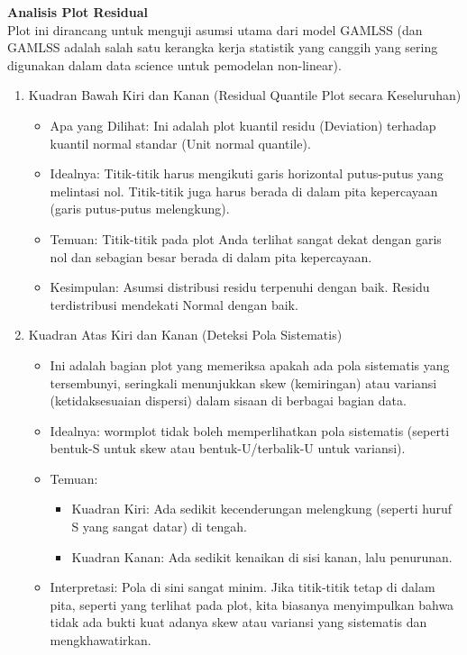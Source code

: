 \documentclass[11pt, a4paper]{article}
\begin{document}
\textbf{Analisis Plot Residual}\\
Plot ini dirancang untuk menguji asumsi utama dari model GAMLSS (dan GAMLSS adalah salah satu kerangka kerja statistik yang canggih yang sering digunakan dalam data science untuk pemodelan non-linear).
\begin{enumerate}
\item Kuadran Bawah Kiri dan Kanan (Residual Quantile Plot secara Keseluruhan)
    \begin{itemize}
    \item Apa yang Dilihat: Ini adalah plot kuantil residu (Deviation) terhadap kuantil normal standar (Unit normal quantile).
    \item Idealnya: Titik-titik harus mengikuti garis horizontal putus-putus yang melintasi nol. Titik-titik juga harus berada di dalam pita kepercayaan (garis putus-putus melengkung).
    \item Temuan: Titik-titik pada plot Anda terlihat sangat dekat dengan garis nol dan sebagian besar berada di dalam pita kepercayaan.
    \item Kesimpulan: Asumsi distribusi residu terpenuhi dengan baik. Residu terdistribusi mendekati Normal dengan baik.
    \end{itemize}
\item Kuadran Atas Kiri dan Kanan (Deteksi Pola Sistematis)
    \begin{itemize}
    \item  Ini adalah bagian plot yang memeriksa apakah ada pola sistematis yang tersembunyi, seringkali menunjukkan skew (kemiringan) atau variansi (ketidaksesuaian dispersi) dalam sisaan di berbagai bagian data.
    \item Idealnya: wormplot tidak boleh memperlihatkan pola sistematis (seperti bentuk-S untuk skew atau bentuk-U/terbalik-U untuk variansi).
    \item Temuan:
        \begin{itemize}
            \item Kuadran Kiri: Ada sedikit kecenderungan melengkung (seperti huruf S yang sangat datar) di tengah.
            \item Kuadran Kanan: Ada sedikit kenaikan di sisi kanan, lalu penurunan.
        \end{itemize}
    \item Interpretasi: Pola di sini sangat minim. Jika titik-titik tetap di dalam pita, seperti yang terlihat pada plot, kita biasanya menyimpulkan bahwa tidak ada bukti kuat adanya skew atau variansi yang sistematis dan mengkhawatirkan.

\end{itemize}
\end{enumerate}
\end{document}
